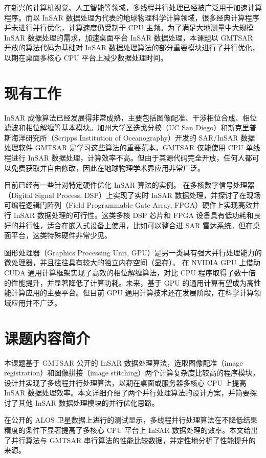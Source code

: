 在新兴的计算机视觉、人工智能等领域，多线程并行处理已经被广泛用于加速计算程序。而以 InSAR 数据处理为代表的地球物理科学计算领域，很多经典计算程序并未进行并行优化，计算速度仍受制于 CPU 主频。为了满足大地测量中大规模 InSAR 数据处理的需求，加速桌面平台 InSAR 数据处理，本课题以 GMTSAR 开放的算法代码为基础对 InSAR 数据处理算法的部分重要模块进行了并行优化，以期在桌面多核心 CPU 平台上减少数据处理时间。

\section{现有工作}

InSAR 成像算法已经发展得非常成熟，主要包括图像配准、干涉相位合成、相位滤波和相位解缠等基本模块。加州大学圣迭戈分校（UC San Diego）和斯克里普斯海洋研究所（Scripps Institution of Oceanography）开发的 SAR/InSAR 数据处理软件 GMTSAR 是学习这些算法的重要范本。GMTSAR 仅能使用 CPU 单线程进行 InSAR 数据处理，计算效率不高。但由于其源代码完全开放，任何人都可以免费获取并自由修改，因此在地球物理学术界应用非常广泛。\cite{sandwell2011gmtsar}

目前已经有一些针对特定硬件优化 InSAR 算法的实例。\citet{shayu2014} 在多核数字信号处理器（Digital Signal Process, DSP）上实现了实时 InSAR 数据处理，并探讨了在现场可编程逻辑门阵列（Field Programmable Gate Array, FPGA）硬件上实现高效并行 InSAR 数据处理的可行性。这类多核 DSP 芯片和 FPGA 设备具有低功耗和良好的并行性，适合在嵌入式设备上使用，比如可以整合进 SAR 雷达系统。但在桌面平台，这类特殊硬件非常少见。

图形处理器（Graphics Processing Unit, GPU）是另一类具有强大并行处理能力的微处理器，并且往往具有较大的独立内存空间（显存）。\citet{reza2015accelerating} 在 NVIDIA GPU 上借助 CUDA 通用计算框架实现了高效的相位解缠算法，对比 CPU 程序取得了数十倍的性能提升，并显著降低了计算功耗。未来，基于 GPU 的通用计算有望成为高性能计算应用的主要平台。但目前 GPU 通用计算技术还在发展阶段，在科学计算领域应用并不广泛。

\section{课题内容简介}

本课题基于 GMTSAR 公开的 InSAR 数据处理算法，选取图像配准（image registration）和图像拼接（image stitching）两个计算复杂度比较高的程序模块，设计并实现了多线程并行处理算法，以期在桌面或服务器多核心 CPU 上提高 InSAR 数据处理效率。本文详细介绍了两个并行处理算法的设计方案，并简要探讨了其他 InSAR 数据处理模块的并行优化思路。

在公开的 ALOS 卫星数据上进行的测试显示，多线程并行处理算法在不降低结果精度的条件下显著提高了多核心 CPU 平台上 InSAR 数据处理的效率。本文给出了并行算法与 GMTSAR 串行算法的性能比较数据，并定性地分析了性能提升的来源。

